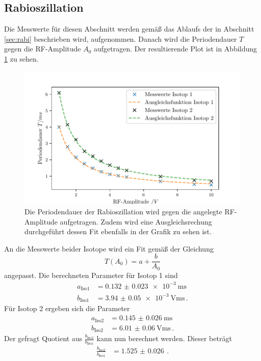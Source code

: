 \subsection{Rabioszillation}
Die Messwerte für diesen Abschnitt werden gemäß das Ablaufs der in Abschnitt \ref{sec:rabi} beschrieben wird, aufgenommen.
Danach wird die Periodendauer $T$ gegen die RF-Amplitude $A_0$ aufgetragen.
Der resultierende Plot ist in Abbildung \ref{fig:rabi} zu sehen.
\begin{figure}
    \centering
    \includegraphics[width=\textwidth]{content/plots/periodendauer.pdf}
    \caption{Die Periodendauer der Rabioszillation wird gegen die angelegte RF-Amplitude aufgetragen.
    Zudem wird eine Ausgleichsrechung durchgeführt dessen Fit ebenfalls in der Grafik zu sehen ist.}
    \label{fig:rabi}
\end{figure}
An die Messwerte beider Isotope wird ein Fit gemäß der Gleichung 
\begin{equation*}
    T(A_0) = a + \frac{b}{A_0}
\end{equation*}
angepasst.
Die berechneten Parameter für Isotop 1 sind 
\begin{align*}
    a_\text{Iso1} &= \SI{0.132(23)e-3}{\ms}\\
    b_\text{Iso1} &= \SI{3.94(5)e-3}{\V\ms} \, .
\end{align*}
Für Isotop 2 ergeben sich die Parameter 
\begin{align*}
    a_\text{Iso2} &= \SI{0.145(26)}{\ms}\\
    b_\text{Iso2} &= \SI{6.01(6)}{\V\ms} \, .
\end{align*}
Der gefragt Quotient aus $\frac{b_\text{Iso2}}{b_\text{Iso1}}$ kann nun berechnet werden.
Dieser beträgt 
\begin{align*}
    \frac{b_\text{Iso2}}{b_\text{Iso1}} &= \SI{1.525(26)}{} \, .
\end{align*}
